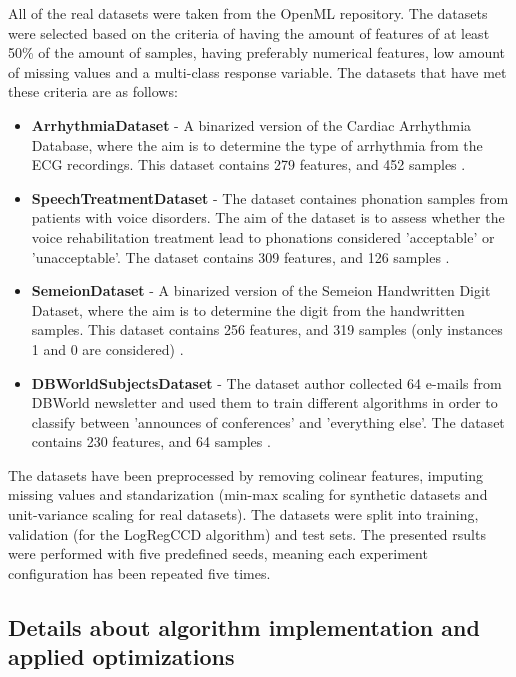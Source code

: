 \documentclass[12pt]{article}
\begin{document}
All of the real datasets were taken from the OpenML \cite{OpenML2013} repository. The datasets were selected based on the criteria of having the amount of features of at least 50\% of the amount of samples, having preferably numerical features, low amount of missing values and a multi-class response variable. The datasets that have met these criteria are as follows:
\begin{itemize}
    \item \textbf{ArrhythmiaDataset} - A binarized version of the Cardiac Arrhythmia Database, where the aim is to determine the type of arrhythmia from the ECG recordings. This dataset contains 279 features, and 452 samples \cite{arrhythmia_5}.
    \item \textbf{SpeechTreatmentDataset} - The dataset containes phonation samples from patients with voice disorders. The aim of the dataset is to assess whether the voice rehabilitation treatment lead to phonations considered 'acceptable' or 'unacceptable'. The dataset contains 309 features, and 126 samples \cite{lsvt_voice_rehabilitation_282}.
    
    \item \textbf{SemeionDataset} - A binarized version of the Semeion Handwritten Digit Dataset, where the aim is to determine the digit from the handwritten samples. This dataset contains 256 features, and 319 samples (only instances 1 and 0 are considered) \cite{semeion_handwritten_digit_178}.
    \item \textbf{DBWorldSubjectsDataset} - The dataset author collected 64 e-mails from DBWorld newsletter and used them to train different algorithms in order to classify between 'announces of conferences' and 'everything else'. The dataset contains 230 features, and 64 samples \cite{dbworld_e-mails_219}.

\end{itemize}

The datasets have been preprocessed by removing colinear features, imputing missing values and standarization (min-max scaling for synthetic datasets and unit-variance scaling for real datasets). The datasets were split into training, validation (for the LogRegCCD algorithm) and test sets. The presented rsults were performed with five predefined seeds, meaning each experiment configuration has been repeated five times.


\subsection{Details about algorithm implementation and applied optimizations}
\end{document}
